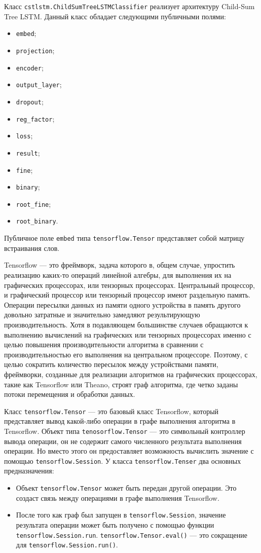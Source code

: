 Класс \texttt{cstlstm.ChildSumTreeLSTMClassifier} реализует архитектуру Child-Sum Tree LSTM\@. Данный класс обладает следующими публичными полями:
\begin{itemize}
\item \texttt{embed};
\item \texttt{projection};
\item \texttt{encoder};
\item \texttt{output\_layer};
\item \texttt{dropout};
\item \texttt{reg\_factor};
\item \texttt{loss};
\item \texttt{result};
\item \texttt{fine};
\item \texttt{binary};
\item \texttt{root\_fine};
\item \texttt{root\_binary}.
\end{itemize}

Публичное поле \texttt{embed} типа \texttt{tensorflow.Tensor} представляет собой матрицу встраивания слов.

Tensorflow --- это фреймворк, задача которого в, общем случае, упростить реализацию каких-то операций линейной алгебры, для выполнения их на графических процессорах, или тензорных процессорах. Центральный процессор, и графический процессор или тензорный процессор имеют раздельную память. Операции пересылки данных из памяти одного устройства в память другого довольно затратные и значительно замедляют результирующую производительность. Хотя в подавляющем большинстве случаев обращаются к выполнению вычислений на графических или тензорных процессорах именно с целью повышения производительности алгоритма в сравнении с производительностью его выполнения на центральном процессоре. Поэтому, с целью сократить количество пересылок между устройствами памяти, фреймворки, созданные для реализации алгоритмов на графических процессорах, такие как Tensorflow или Theano, строят граф алгоритма, где четко заданы потоки перемещения и обработки данных.

Класс \texttt{tensorflow.Tensor} --- это базовый класс Tensorflow, который представляет вывод какой-либо операции в графе выполнения алгоритма в Tensorflow. Объект типа \texttt{tenosorflow.Tensor} --- это символьный контроллер вывода операции, он не содержит самого численного результата выполнения операции. Но вместо этого он предоставляет возможность вычислить значение с помощью \texttt{tensorflow.Session}. У класса \texttt{tensor\-flow.Tenser} два основных предназначения:
\begin{itemize}
\item Объект \texttt{tensorflow.Tensor} может быть передан другой операции. Это создаст связь между операциями в графе выполнения Tensorflow.
\item После того как граф был запущен в \texttt{tensorflow.Session}, значение результата операции может быть получено с помощью функции \texttt{ten\-sorflow.Sessi\-on.run}. \texttt{tensorflow.Tensor.eval()} --- это сокращение для \texttt{tensorflow.Ses\-sion.run()}.
\end{itemize}

